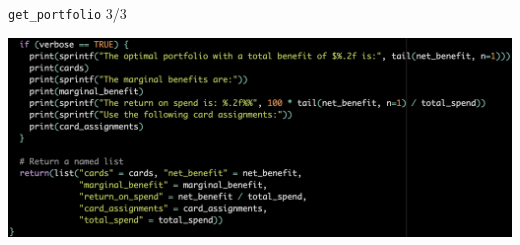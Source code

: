 \begin{frame}{\texttt{get\_portfolio} 3/3}
    \begin{center}
        \includegraphics[width=0.9\textheight]{../Misc/RCode_portfolio3.png}
    \end{center}
\end{frame} 

%     
%     
